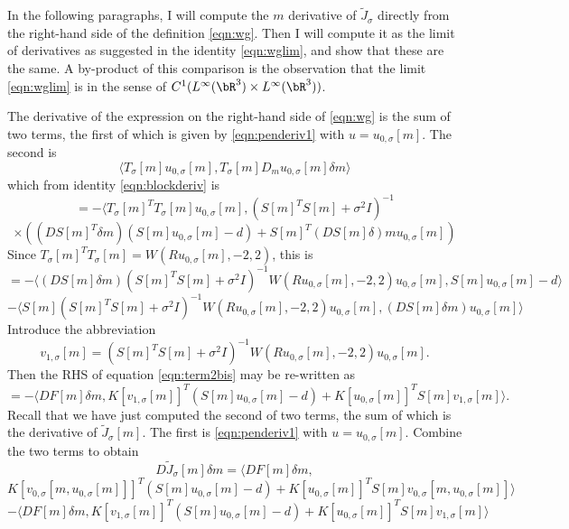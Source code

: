 In the following paragraphs, I will compute the $m$ derivative of
$\tilde{J}_{\sigma}$ directly from the right-hand side of the
definition \ref{eqn:wg}. Then I will compute it as the limit of
derivatives as suggested in the identity \ref{eqn:wglim}, and show
that these are the same.  A by-product of this comparison is the
observation that the limit \ref{eqn:wglim} is in the sense of
$C^1(L^{\infty}(\bR^3) \times L^{\infty}(\bR^3))$.

The derivative of the expression on the right-hand side of
\ref{eqn:wg} is the sum of two terms, the first of which is given by
\ref{eqn:penderiv1} with $u = u_{0,\sigma}[m]$. The second is
\[
  \langle T_{\sigma}[m]u_{0,\sigma}[m], T_{\sigma}[m]D_m
  u_{0,\sigma}[m]\delta m \rangle
\]
which from identity \ref{eqn:blockderiv} is
\[
  = -\langle  T_{\sigma}[m]^TT_{\sigma}[m]u_{0,\sigma}[m], (S[m]^TS[m] + \sigma^2I)^{-1}
\]
\[
  \times ((DS[m]^{T}\delta m) (S[m]u_{0,\sigma}[m]-d) +
  S[m]^T(DS[m]\delta) m u_{0,\sigma}[m])
\]
Since
$T_{\sigma}[m]^TT_{\sigma}[m] = W(Ru_{0,\sigma}[m],-2,2)$, this is
\[
  = -\langle (DS[m]\delta m) (S[m]^TS[m] +
  \sigma^2I)^{-1}W(Ru_{0,\sigma}[m],-2,2)u_{0,\sigma}[m],
  S[m]u_{0,\sigma}[m] - d \rangle
\]
\begin{equation}
  \label{eqn:term2}
  - \langle S[m] (S[m]^TS[m] +
  \sigma^2I)^{-1}W(Ru_{0,\sigma}[m],-2,2)u_{0,\sigma}[m], (DS[m]\delta
  m)u_{0,\sigma}[m] \rangle
\end{equation}
Introduce the abbreviation
\begin{equation}
  \label{eqn:defv1}
  v_{1,\sigma}[m] = (S[m]^TS[m] + \sigma^2I)^{-1}W(Ru_{0,\sigma}[m],-2,2)u_{0,\sigma}[m].
\end{equation}
Then the RHS of equation \ref{eqn:term2bis} may be re-written as
\begin{equation}
  \label{eqn:term2bis}
  = -\langle DF[m]\delta m, K[v_{1,\sigma}[m]]^T (S[m]u_{0,\sigma}[m]-d) + 
  K[u_{0,\sigma}[m]]^T S[m] v_{1,\sigma}[m] \rangle.
\end{equation}
Recall that we have just computed the second of two terms, the sum of
which is the derivative of $\tilde{J}_{\sigma}[m]$. The first is
\ref{eqn:penderiv1} with $u = u_{0,\sigma}[m]$. Combine the two
terms to obtain
\[
  D\tilde{J}_{\sigma}[m] \delta m = \langle DF[m]\delta m,
\]
\[
  K[v_{0,\sigma}[m,u_{0,\sigma}[m]]]^T(S[m]u_{0,\sigma}[m]-d)
+
K[u_{0,\sigma}[m]]^T S[m]v_{0,\sigma}[m,u_{0,\sigma}[m]]\rangle
\]
\[
  -\langle DF[m]\delta m, K[v_{1,\sigma}[m]]^T (S[m]u_{0,\sigma}[m]-d) + 
  K[u_{0,\sigma}[m]]^T S[m] v_{1,\sigma}[m] \rangle
\]
